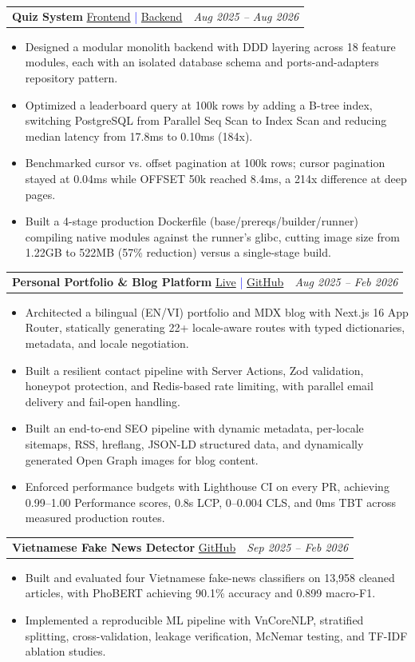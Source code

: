 \documentclass[letterpaper,11pt]{article}
\makeatletter
\newcommand{\resumeProjectHeading}[3]{
  \vspace{-2pt}\item
    \begin{tabular*}{0.97\textwidth}[t]{l@{\extracolsep{\fill}}r}
      \textbf{#1} \scriptsize \textcolor{blue}{#3} & \textit{\small #2} \\
    \end{tabular*}\vspace{-6pt}
}
\newcommand{\resumeItemPlain}[1]{
  \item\small{
    {#1 \vspace{-4pt}}
  }
}
\newcommand{\resumeItemListStart}{\begin{itemize}}
\newcommand{\resumeItemListEnd}{\end{itemize}\vspace{-7pt}}
\makeatother
\begin{document}
\resumeProjectHeading
  {Quiz System}{Aug 2025 -- Aug 2026}{\href{https://github.com/hoanganh0705/quiz_frontend}{Frontend} \;|\; \href{https://github.com/hoanganh0705/quiz_backend}{Backend}}
  \resumeItemListStart
    \resumeItemPlain{Designed a modular monolith backend with DDD layering across 18 feature modules, each with an isolated database schema and ports-and-adapters repository pattern.}
    \resumeItemPlain{Optimized a leaderboard query at 100k rows by adding a B-tree index, switching PostgreSQL from Parallel Seq Scan to Index Scan and reducing median latency from 17.8ms to 0.10ms (184x).}
    \resumeItemPlain{Benchmarked cursor vs. offset pagination at 100k rows; cursor pagination stayed at 0.04ms while OFFSET 50k reached 8.4ms, a 214x difference at deep pages.}
    \resumeItemPlain{Built a 4-stage production Dockerfile (base/prereqs/builder/runner) compiling native modules against the runner's glibc, cutting image size from 1.22GB to 522MB (57\% reduction) versus a single-stage build.}
  \resumeItemListEnd

\resumeProjectHeading
  {Personal Portfolio \& Blog Platform}
  {Aug 2025 -- Feb 2026}
  {\href{https://anhnguyendev.tech}{Live} \;|\; \href{https://github.com/hoanganh0705/Portfolio}{GitHub}}
  \resumeItemListStart
    \resumeItemPlain{Architected a bilingual (EN/VI) portfolio and MDX blog with Next.js 16 App Router, statically generating 22+ locale-aware routes with typed dictionaries, metadata, and locale negotiation.}
    \resumeItemPlain{Built a resilient contact pipeline with Server Actions, Zod validation, honeypot protection, and Redis-based rate limiting, with parallel email delivery and fail-open handling.}
    \resumeItemPlain{Built an end-to-end SEO pipeline with dynamic metadata, per-locale sitemaps, RSS, hreflang, JSON-LD structured data, and dynamically generated Open Graph images for blog content.}
    \resumeItemPlain{Enforced performance budgets with Lighthouse CI on every PR, achieving 0.99–1.00 Performance scores, 0.8s LCP, 0–0.004 CLS, and 0ms TBT across measured production routes.}
  \resumeItemListEnd

  \resumeProjectHeading
  {Vietnamese Fake News Detector}
  {Sep 2025 -- Feb 2026}
  {\href{https://github.com/hoanganh0705/FakeNewsDetector}{GitHub}}
  \resumeItemListStart
    \resumeItemPlain{Built and evaluated four Vietnamese fake-news classifiers on 13,958 cleaned articles, with PhoBERT achieving 90.1\% accuracy and 0.899 macro-F1.}
    \resumeItemPlain{Implemented a reproducible ML pipeline with VnCoreNLP, stratified splitting, cross-validation, leakage verification, McNemar testing, and TF-IDF ablation studies.}
  \resumeItemListEnd
\end{document}
